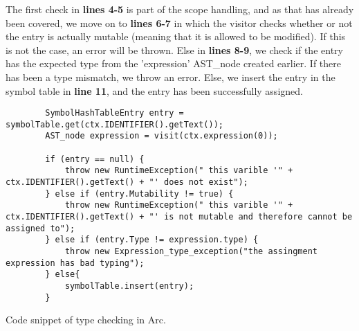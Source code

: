 The first check in \textbf{lines 4-5} is part of the scope handling, and as that has already been covered, we move on to \textbf{lines 6-7} in which the visitor checks whether or not the entry is actually mutable (meaning that it is allowed to be modified). If this is not the case, an error will be thrown. Else in \textbf{lines 8-9}, we check if the entry has the expected type from the 'expression' AST\_node created earlier. If there has been a type mismatch, we throw an error. Else, we insert the entry in the symbol table in \textbf{line 11}, and the entry has been successfully assigned.



\begin{listing}[htb!]
    \begin{verbatim}
        SymbolHashTableEntry entry = symbolTable.get(ctx.IDENTIFIER().getText());
        AST_node expression = visit(ctx.expression(0));

        if (entry == null) {
            throw new RuntimeException(" this varible '" + ctx.IDENTIFIER().getText() + "' does not exist");
        } else if (entry.Mutability != true) {
            throw new RuntimeException(" this varible '" + ctx.IDENTIFIER().getText() + "' is not mutable and therefore cannot be assigned to");
        } else if (entry.Type != expression.type) {
            throw new Expression_type_exception("the assingment expression has bad typing");
        } else{
            symbolTable.insert(entry);
        }
    \end{verbatim}
    \caption{Code snippet of type checking in Arc.}
    \label{lst:typecheckerexample}
\end{listing}
